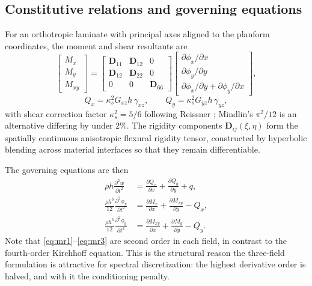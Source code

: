 \documentclass[11pt,a4paper]{article}
\theoremstyle{definition}
\numberwithin{equation}{section}
\begin{document}
\subsection{Constitutive relations and governing equations}
\label{sec:constitutive}

For an orthotropic laminate with principal axes aligned to the planform coordinates, the moment and shear resultants are
\begin{equation}
\label{eq:moments}
\begin{bmatrix} M_x \\ M_y \\ M_{xy} \end{bmatrix}
=
\begin{bmatrix}
\mathbf{D}_{11} & \mathbf{D}_{12} & 0 \\
\mathbf{D}_{12} & \mathbf{D}_{22} & 0 \\
0 & 0 & \mathbf{D}_{66}
\end{bmatrix}
\begin{bmatrix}
\partial \phi_x / \partial x \\
\partial \phi_y / \partial y \\
\partial \phi_x / \partial y + \partial \phi_y / \partial x
\end{bmatrix},
\end{equation}
\begin{equation}
\label{eq:shears}
Q_x = \kappa_s^2 G_{xz} h\, \gamma_{xz},
\qquad
Q_y = \kappa_s^2 G_{yz} h\, \gamma_{yz},
\end{equation}
with shear correction factor $\kappa_s^2 = 5/6$ following Reissner \cite{reissner1945}; Mindlin's $\pi^2/12$ is an alternative differing by under $2\%$. The rigidity components $\mathbf{D}_{ij}(\xi,\eta)$ form the spatially continuous anisotropic flexural rigidity tensor, constructed by hyperbolic blending across material interfaces so that they remain differentiable.

The governing equations are then
\begin{align}
\rho h \frac{\partial^2 w}{\partial t^2} &= \frac{\partial Q_x}{\partial x} + \frac{\partial Q_y}{\partial y} + q, \label{eq:mr1}\\
\frac{\rho h^3}{12} \frac{\partial^2 \phi_x}{\partial t^2} &= \frac{\partial M_x}{\partial x} + \frac{\partial M_{xy}}{\partial y} - Q_x, \label{eq:mr2}\\
\frac{\rho h^3}{12} \frac{\partial^2 \phi_y}{\partial t^2} &= \frac{\partial M_{xy}}{\partial x} + \frac{\partial M_y}{\partial y} - Q_y. \label{eq:mr3}
\end{align}
Note that \cref{eq:mr1}--\cref{eq:mr3} are second order in each field, in contrast to the fourth-order Kirchhoff equation. This is the structural reason the three-field formulation is attractive for spectral discretization: the highest derivative order is halved, and with it the conditioning penalty.
\end{document}
